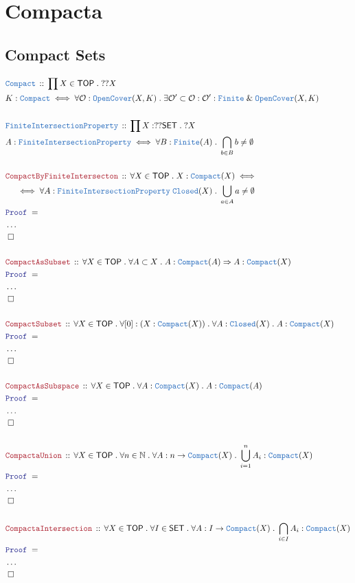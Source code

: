 \documentclass[12pt]{scrartcl}
\newcommand{\TYPE}[1]{\textcolor{NavyBlue}{\mathtt{#1}}}
\newcommand{\LOGIC}[1]{\textcolor{Blue}{\mathtt{#1}}}
\newcommand{\THM}[1]{\textcolor{Maroon}{\mathtt{#1}}}
\renewcommand{\.}{\; . \;}
\newcommand{\Theorem}[2]{& \THM{#1} \, :: \, #2 \\ & \Proof = \\ }
\newcommand{\DeclareType}[2]{& \TYPE{#1} \, :: \, #2 \\}
\newcommand{\DefineType}[3]{& #1 : \TYPE{#2} \iff #3 \\}
\newcommand{\NewLine}{\\ & \kern 1pc}
\newcommand{\Page}[1]{ \begin{align*} #1 \end{align*}   }
\newcommand{\NoProof}{ & \ldots \\ \EndProof}
\renewcommand{\And}{\; \& \;}
\newcommand{\Imply}{\Rightarrow}
\newcommand{\Nat}{\mathbb{N} }
\newcommand{\QED}{\; \square}
\newcommand{\EndProof}{& \QED \\}
\newcommand{\Proof}{\LOGIC{Proof} \; }
\newcommand{\SET}{\mathsf{SET}}
\newcommand{\TOP}{\mathsf{TOP}}
\renewcommand{\O}{\mathcal{O}}
\begin{document}
\section{Compacta}
\subsection{Compact Sets}
\Page{
	\DeclareType{Compact}{ \prod X \in \TOP \.  ??X  }
	\DefineType{K}{Compact}{
		\forall \O :\TYPE{OpenCover}(X,K) \. 
		\exists \O' \subset \O : 
		\O' : \TYPE{Finite} \And
			\TYPE{OpenCover}(X,K)
	}
	\\
	\DeclareType{FiniteIntersectionProperty}{ \prod X : ??\SET \. ?X }
	\DefineType{A}{FiniteIntersectionProperty}{
			\forall B : \TYPE{Finite}(A) \.
			\bigcap_{b \in B} b \neq \emptyset
	}
	\\
	\Theorem{CompactByFiniteIntersecton}
	{
		\forall X \in \TOP \.
		X : \TYPE{Compact}(X) 
		\iff \NewLine \iff
		\forall A : \TYPE{FiniteIntersectionProperty} \; \TYPE{Closed}(X) \.
		\bigcup_{a \in A} a \neq \emptyset
	}
	\NoProof
	\\
	\Theorem{CompactAsSubset}
	{
		\forall X \in \TOP \.
		\forall A \subset X \. 
		A : \TYPE{Compact}(A) \Imply A : \TYPE{Compact}(X)
	}
	\NoProof
	\\
	\Theorem{CompactSubset}
	{
		\forall X \in \TOP \.
		\forall [0] : (X : \TYPE{Compact}(X) ) \. 
		\forall A : \TYPE{Closed}(X) \.
		A : \TYPE{Compact}(X)
	}
	\NoProof	
	\\
	\Theorem{CompactAsSubspace}
	{
		\forall X \in \TOP \.
		\forall A : \TYPE{Compact}(X) \. 
		A : \TYPE{Compact}(A)
	}
	\NoProof
	\\
	\Theorem{CompactaUnion}
	{
		\forall X \in \TOP \.
		\forall n \in \Nat \. 
		\forall A : n \to \TYPE{Compact}(X) \.
		\bigcup^n_{i=1} A_i : \TYPE{Compact}(X)
	}
	\NoProof
	\\
	\Theorem{CompactaIntersection}
	{
		\forall X \in \TOP \.
		\forall I \in \SET \. 
		\forall A : I \to \TYPE{Compact}(X) \.
		\bigcap_{i \in I} A_i : \TYPE{Compact}(X)
	}
	\NoProof
}
\end{document}
